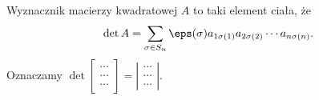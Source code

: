 \begin{definition}
    \label{d:determinant}
    Wyznacznik macierzy kwadratowej $A$ to taki element ciała, że
    \[ \det A = \sum_{\sigma\in S_n} \eps(\sigma)a_{1\sigma(1)}a_{2\sigma(2)}\cdots a_{n\sigma(n)}. \]
    Oznaczamy $\det
    \left[\begin{smallmatrix}
        \cdots \\ \cdots \\ \cdots
    \end{smallmatrix}\right] =
    \left|\begin{smallmatrix}
        \cdots \\ \cdots \\ \cdots
    \end{smallmatrix}\right|$.
\end{definition}

